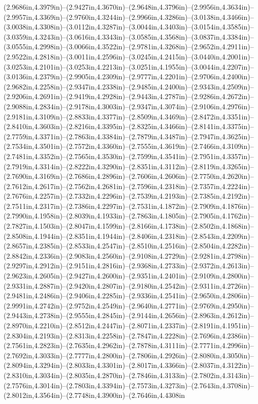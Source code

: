 (2.9686in,4.3979in)--(2.9427in,4.3670in)--(2.9648in,4.3796in)--(2.9956in,4.3634in)--(2.9957in,4.3369in)--(2.9760in,4.3244in)--(2.9966in,4.3286in)--(3.0138in,4.3466in)--(3.0038in,4.3308in)--(3.0112in,4.3287in)--(3.0044in,4.3403in)--(3.0154in,4.3585in)--(3.0359in,4.3243in)--(3.0616in,4.3343in)--(3.0585in,4.3568in)--(3.0837in,4.3384in)--(3.0555in,4.2998in)--(3.0066in,4.3522in)--(2.9781in,4.3268in)--(2.9652in,4.2911in)--(2.9522in,4.2818in)--(3.0011in,4.2596in)--(3.0245in,4.2415in)--(3.0440in,4.2001in)--(3.0253in,4.2101in)--(3.0253in,4.2213in)--(3.0251in,4.1955in)--(3.0044in,4.2207in)--(3.0136in,4.2379in)--(2.9905in,4.2309in)--(2.9777in,4.2201in)--(2.9706in,4.2400in)--(2.9682in,4.2258in)--(2.9347in,4.2338in)--(2.9485in,4.2400in)--(2.9343in,4.2509in)--(2.9206in,4.2691in)--(2.9419in,4.2928in)--(2.9443in,4.2787in)--(2.9286in,4.2672in)--(2.9088in,4.2834in)--(2.9178in,4.3003in)--(2.9347in,4.3074in)--(2.9106in,4.2976in)--(2.9181in,4.3109in)--(2.8833in,4.3377in)--(2.8509in,4.3469in)--(2.8472in,4.3351in)--(2.8410in,4.3603in)--(2.8216in,4.3395in)--(2.8325in,4.3466in)--(2.8141in,4.3375in)--(2.7759in,4.3371in)--(2.7863in,4.3384in)--(2.7879in,4.3487in)--(2.7947in,4.3625in)--(2.7534in,4.3501in)--(2.7572in,4.3360in)--(2.7555in,4.3619in)--(2.7466in,4.3109in)--(2.7481in,4.3352in)--(2.7565in,4.3530in)--(2.7599in,4.3541in)--(2.7951in,4.3357in)--(2.7919in,4.3314in)--(2.8222in,4.3290in)--(2.8351in,4.3112in)--(2.8119in,4.3265in)--(2.7690in,4.3169in)--(2.7686in,4.2896in)--(2.7606in,4.2606in)--(2.7750in,4.2620in)--(2.7612in,4.2617in)--(2.7562in,4.2681in)--(2.7596in,4.2318in)--(2.7357in,4.2224in)--(2.7676in,4.2257in)--(2.7332in,4.2296in)--(2.7539in,4.2193in)--(2.7385in,4.2192in)--(2.7511in,4.2317in)--(2.7386in,4.2297in)--(2.7531in,4.1872in)--(2.7909in,4.1876in)--(2.7990in,4.1958in)--(2.8039in,4.1933in)--(2.7863in,4.1805in)--(2.7905in,4.1762in)--(2.7827in,4.1503in)--(2.8047in,4.1599in)--(2.8166in,4.1738in)--(2.8502in,4.1868in)--(2.8508in,4.1944in)--(2.8351in,4.1944in)--(2.8406in,4.2318in)--(2.8543in,4.2209in)--(2.8657in,4.2385in)--(2.8533in,4.2547in)--(2.8510in,4.2516in)--(2.8504in,4.2282in)--(2.8842in,4.2336in)--(2.9083in,4.2560in)--(2.9108in,4.2729in)--(2.9281in,4.2798in)--(2.9297in,4.2912in)--(2.9151in,4.2816in)--(2.9368in,4.2733in)--(2.9372in,4.2613in)--(2.9623in,4.2605in)--(2.9427in,4.2600in)--(2.9351in,4.2401in)--(2.9109in,4.2800in)--(2.9331in,4.2887in)--(2.9420in,4.2807in)--(2.9180in,4.2542in)--(2.9311in,4.2726in)--(2.9481in,4.2486in)--(2.9406in,4.2285in)--(2.9336in,4.2541in)--(2.9650in,4.2806in)--(2.9991in,4.2742in)--(2.9752in,4.2549in)--(2.9640in,4.2771in)--(2.9769in,4.2950in)--(2.9443in,4.2738in)--(2.9555in,4.2845in)--(2.9144in,4.2656in)--(2.8963in,4.2612in)--(2.8970in,4.2210in)--(2.8512in,4.2447in)--(2.8071in,4.2337in)--(2.8191in,4.1951in)--(2.8304in,4.2193in)--(2.8313in,4.2258in)--(2.7847in,4.2228in)--(2.7696in,4.2386in)--(2.7561in,4.2823in)--(2.7635in,4.2962in)--(2.7878in,4.3111in)--(2.7771in,4.2996in)--(2.7692in,4.3033in)--(2.7777in,4.2800in)--(2.7806in,4.2926in)--(2.8080in,4.3050in)--(2.8094in,4.3294in)--(2.8033in,4.3301in)--(2.8017in,4.3366in)--(2.8037in,4.3122in)--(2.8310in,4.3034in)--(2.8035in,4.2870in)--(2.7846in,4.3133in)--(2.7802in,4.3143in)--(2.7576in,4.3014in)--(2.7803in,4.3394in)--(2.7573in,4.3273in)--(2.7643in,4.3708in)--(2.8012in,4.3564in)--(2.7748in,4.3900in)--(2.7646in,4.4308in